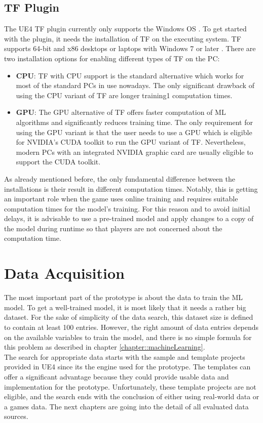 \documentclass[MGS,Master,english]{twbook}%
\begin{document}
\subsection{\acl{TF} Plugin}
The UE4 \ac{TF} plugin currently only supports the Windows OS \cite{ue4::tensorFlowPlugin}. To get started with the plugin, it needs the installation of \ac{TF} on the executing system. \ac{TF} supports 64-bit and x86 desktops or laptops with Windows 7 or later \cite{api::tensorFlow}. There are two installation options for enabling different types of \ac{TF} on the PC:
\begin{itemize}
	\item \textbf{\ac{CPU}}: \ac{TF} with CPU support is the standard alternative which works for most of the standard PCs in use nowadays. The only significant drawback of using the CPU variant of \ac{TF} are longer training1 computation times.
	\item \textbf{\ac{GPU}}: The GPU alternative of \ac{TF} offers faster computation of ML algorithms and significantly reduces training time. The only requirement for using the GPU variant is that the user needs to use a GPU which is eligible for NVIDIA's CUDA toolkit \cite{nvidia::cudaToolkit} to run the GPU variant of \ac{TF}. Nevertheless, modern PCs with an integrated NVIDIA graphic card are usually eligible to support the CUDA toolkit. 
\end{itemize}
As already mentioned before, the only fundamental difference between the installations is their result in different computation times. Notably, this is getting an important role when the game uses online training and requires suitable computation times for the model's training. For this reason and to avoid initial delays, it is advisable to use a pre-trained model and apply changes to a copy of the model during runtime so that players are not concerned about the computation time.

\section{Data Acquisition}
The most important part of the prototype is about the data to train the ML model. To get a well-trained model, it is most likely that it needs a rather big dataset. For the sake of simplicity of the data search, this dataset size is defined to contain at least 100 entries. However, the right amount of data entries depends on the available variables to train the model, and there is no simple formula for this problem as described in chapter \ref{chapter::machineLearning}. \\
The search for appropriate data starts with the sample and template projects provided in UE4 since its the engine used for the prototype. The templates can offer a significant advantage because they could provide usable data and implementation for the prototype. Unfortunately, these template projects are not eligible, and the search ends with the conclusion of either using real-world data or a games data. The next chapters are going into the detail of all evaluated data sources.
\end{document}
